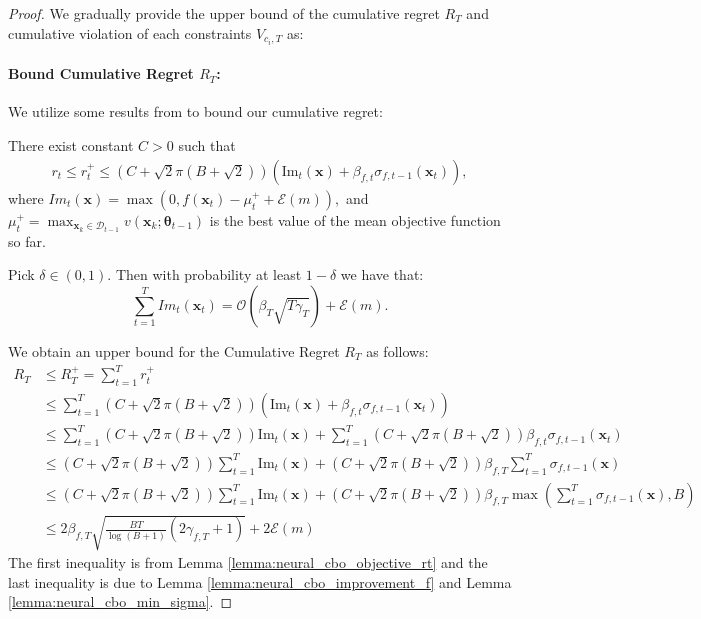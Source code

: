 \begin{proof}

We gradually provide the upper bound of the cumulative regret $R_T$ and cumulative violation of each constraints $V_{c_i,T}$ as: 
\paragraph{Bound Cumulative Regret $R_{T}$:}
We utilize some results from \citep{tran2022regret} to bound our cumulative regret:
\begin{lemma}
    \label{lemma:neural_cbo_objective_rt}
    There exist constant $C > 0$ such that
    \begin{align*}
        r_t \le r_t^+ \le \left(C + \sqrt{2}\pi(B + \sqrt{2}) \right)\left(\text{Im}_t (\mathbf{x})+ \beta_{f,t} \sigma_{f,t-1}(\mathbf{x}_t) \right),
    \end{align*}
    where $Im_t (\mathbf{x}) = \max(0, f(\mathbf{x}_t) - \mu_t^+ + \mathcal{E}(m)), $ and $\mu^+_t = \max_{\mathbf{x}_k \in \mathcal{D}_{t-1}} v(\mathbf{x}_k; \boldsymbol{\theta}_{t-1})$ is the best value of the mean objective function so far. 
\end{lemma}

\begin{lemma}
\label{lemma:neural_cbo_improvement_f}
    Pick $\delta \in (0, 1)$. Then with probability at least $1 - \delta$ we have that:
    \[ \sum_{t=1}^T {Im}_t (\mathbf{x}_t) = \mathcal{O}(\beta_T \sqrt{T\gamma_T} ) + \mathcal{E}(m). \]
\end{lemma}

We obtain an upper bound for the Cumulative Regret $R_T$ as follows:
\begin{align*}
    R_T & \le R_T^+ = \sum_{t=1}^T r_t^+
    \\
    & \le \sum_{t=1}^T \left(C + \sqrt{2}\pi(B + \sqrt{2}) \right)\left(\text{Im}_t (\mathbf{x})+ \beta_{f,t} \sigma_{f,t-1}(\mathbf{x}_t) \right)
    \\
    & \le \sum_{t=1}^T \left(C + \sqrt{2}\pi(B + \sqrt{2}) \right) \text{Im}_t (\mathbf{x}) +  \sum_{t=1}^T  \left(C + \sqrt{2}\pi(B + \sqrt{2}) \right) \beta_{f,t} \sigma_{f,t-1}(\mathbf{x}_t) 
    \\
    & \le \left(C + \sqrt{2}\pi(B + \sqrt{2}) \right) \sum_{t=1}^T \text{Im}_t (\mathbf{x}) +  \left(C + \sqrt{2}\pi(B + \sqrt{2}) \right) \beta_{f,T} \sum_{t=1}^T \sigma_{f,t-1}(\mathbf{x})
    \\
    & \le \left(C + \sqrt{2}\pi(B + \sqrt{2}) \right) \sum_{t=1}^T \text{Im}_t (\mathbf{x}) +  \left(C + \sqrt{2}\pi(B + \sqrt{2}) \right) \beta_{f,T} \max \left(\sum_{t=1}^T \sigma_{f,t-1}(\mathbf{x}), B \right) 
    \\
    & \le 2 \beta_{f,T} \sqrt{\frac{B T}{\log(B+1)} (2\gamma_{f,T}+1)} + 2 \mathcal{E}(m)
\end{align*}
The first inequality is from Lemma \ref{lemma:neural_cbo_objective_rt} and the last inequality is due to Lemma \ref{lemma:neural_cbo_improvement_f} and Lemma \ref{lemma:neural_cbo_min_sigma}. 

\end{proof}
